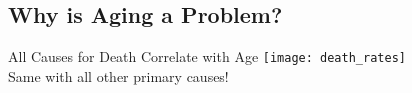 \subsection{Why is Aging a Problem?}





\begin{frame}[c]{All Causes for Death Correlate with Age}
    \large
    \texttt{[image: death\_rates]} \\
    Same with all other primary causes!
\end{frame}


